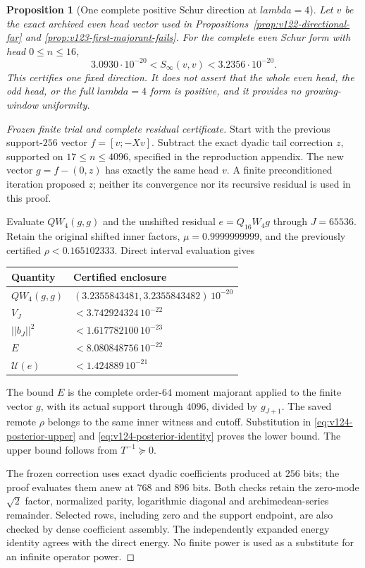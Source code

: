 \documentclass[11pt]{article}
\def\lambda{lambda}%
\def\norm#1{||#1||}%
\newtheorem{proposition}[theorem]{Proposition}
\theoremstyle{remark}
\newcommand{\norm}[1]{\left\lVert #1\right\rVert}
\begin{document}
\begin{proposition}[One complete positive Schur direction at $\lambda=4$]
\label{prop:v124-positive-direction}
Let $v$ be the exact archived even head vector used in
Propositions~\ref{prop:v122-directional-far} and
\ref{prop:v123-first-majorant-fails}. For the \emph{complete}
even Schur form with head $0\le n\le16$,
\begin{equation}\label{eq:v124-positive-direction}
 3.0930\cdot10^{-20}<S_\infty(v,v)<3.2356\cdot10^{-20}.
\end{equation}
This certifies one fixed direction. It does not assert that the
whole even head, the odd head, or the full $\lambda=4$ form is
positive, and it provides no growing-window uniformity.
\end{proposition}
\begin{proof}[Frozen finite trial and complete residual certificate]
Start with the previous support-$256$ vector $f=[v;-Xv]$.
Subtract the exact dyadic tail correction $z$, supported on
$17\le n\le4096$, specified in the reproduction appendix.
The new vector $g=f-(0,z)$ has exactly the same head $v$.
A finite preconditioned iteration proposed $z$; neither its
convergence nor its recursive residual is used in this proof.

Evaluate $QW_4(g,g)$ and the unshifted residual
$e=Q_{16}W_4g$ through $J=65536$. Retain the original shifted
inner factors, $\mu=0.9999999999$, and the previously certified
$\rho<0.165102333$. Direct interval evaluation gives
\begin{center}
\begin{tabular}{@{}ll@{}}
\toprule Quantity & Certified enclosure\\\midrule
$QW_4(g,g)$ & $(3.2355843481,3.2355843482)\,10^{-20}$\\
$V_J$ & $<3.742924324\,10^{-22}$\\
$\norm{b_J}^2$ & $<1.617782100\,10^{-23}$\\
$E$ & $<8.080848756\,10^{-22}$\\
$\mathcal U(e)$ & $<1.424889\,10^{-21}$\\\bottomrule
\end{tabular}
\end{center}
The bound $E$ is the complete order-$64$ moment majorant applied
to the finite vector $g$, with its actual support through $4096$,
divided by $g_{J+1}$. The saved remote $\rho$ belongs to the same
inner witness and cutoff. Substitution in
\eqref{eq:v124-posterior-upper} and
\eqref{eq:v124-posterior-identity} proves the lower bound.
The upper bound follows from $T^{-1}\succeq0$.

The frozen correction uses exact dyadic coefficients produced at
$256$ bits; the proof evaluates them anew at $768$ and $896$
bits. Both checks retain the zero-mode $\sqrt2$ factor, normalized
parity, logarithmic diagonal and archimedean-series remainder.
Selected rows, including zero and the support endpoint, are also
checked by dense coefficient assembly. The independently expanded
energy identity agrees with the direct energy. No finite power is
used as a substitute for an infinite operator power.
\end{proof}
\end{document}
